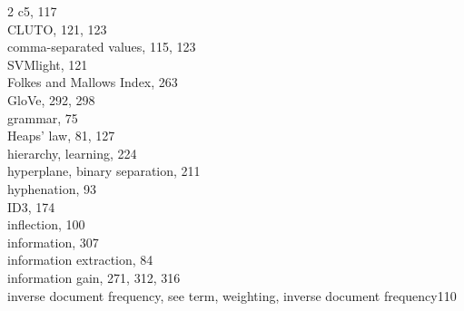 \documentclass[11pt,openany,executivepaper]{book}
\begin{document}
\begin{multicols}{2}
c5, 117\\
CLUTO, 121, 123\\
comma-separated values, 115, 123\\
SVMlight, 121\\
Folkes and Mallows Index, 263\\
GloVe, 292, 298\\
grammar, 75\\
Heaps' law, 81, 127\\
hierarchy, learning, 224\\
hyperplane, binary separation, 211\\
hyphenation, 93\\
ID3, 174\\
inflection, 100\\
information, 307\\
information extraction, 84\\
information gain, 271, 312, 316\\
inverse document frequency, see term, weighting, inverse document frequency110


\end{multicols}
\end{document}
